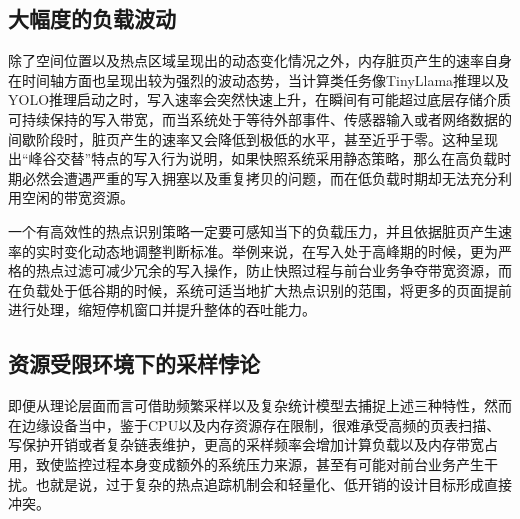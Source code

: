 \subsection{大幅度的负载波动}

除了空间位置以及热点区域呈现出的动态变化情况之外，内存脏页产生的速率自身在时间轴方面也呈现出较为强烈的波动态势，当计算类任务像TinyLlama推理以及YOLO推理启动之时，写入速率会突然快速上升，在瞬间有可能超过底层存储介质可持续保持的写入带宽，而当系统处于等待外部事件、传感器输入或者网络数据的间歇阶段时，脏页产生的速率又会降低到极低的水平，甚至近乎于零。这种呈现出“峰谷交替”特点的写入行为说明，如果快照系统采用静态策略，那么在高负载时期必然会遭遇严重的写入拥塞以及重复拷贝的问题，而在低负载时期却无法充分利用空闲的带宽资源。

一个有高效性的热点识别策略一定要可感知当下的负载压力，并且依据脏页产生速率的实时变化动态地调整判断标准。举例来说，在写入处于高峰期的时候，更为严格的热点过滤可减少冗余的写入操作，防止快照过程与前台业务争夺带宽资源，而在负载处于低谷期的时候，系统可适当地扩大热点识别的范围，将更多的页面提前进行处理，缩短停机窗口并提升整体的吞吐能力。

\subsection{资源受限环境下的采样悖论}

即便从理论层面而言可借助频繁采样以及复杂统计模型去捕捉上述三种特性，然而在边缘设备当中，鉴于CPU以及内存资源存在限制，很难承受高频的页表扫描、写保护开销或者复杂链表维护，更高的采样频率会增加计算负载以及内存带宽占用，致使监控过程本身变成额外的系统压力来源，甚至有可能对前台业务产生干扰。也就是说，过于复杂的热点追踪机制会和轻量化、低开销的设计目标形成直接冲突。

